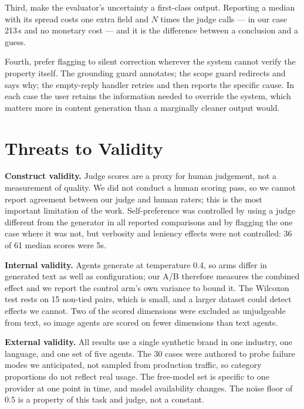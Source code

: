 \documentclass[journal]{IEEEtran}
\begin{document}
Third, make the evaluator's uncertainty a first-class output. Reporting a
median with its spread costs one extra field and $N$ times the judge calls ---
in our case 213\,s and no monetary cost --- and it is the difference between a
conclusion and a guess.

Fourth, prefer flagging to silent correction wherever the system cannot verify
the property itself. The grounding guard annotates; the scope guard redirects
and says why; the empty-reply handler retries and then reports the specific
cause. In each case the user retains the information needed to override the
system, which matters more in content generation than a marginally cleaner
output would.

\section{Threats to Validity}
\label{sec:threats}

\textbf{Construct validity.} Judge scores are a proxy for human judgement, not
a measurement of quality. We did not conduct a human scoring pass, so we cannot
report agreement between our judge and human raters; this is the most important
limitation of the work. Self-preference was controlled by using a judge
different from the generator in all reported comparisons and by flagging the
one case where it was not, but verbosity and leniency effects were not
controlled: 36 of 61 median scores were 5s.

\textbf{Internal validity.} Agents generate at temperature 0.4, so arms differ
in generated text as well as configuration; our A/B therefore measures the
combined effect and we report the control arm's own variance to bound it. The
Wilcoxon test rests on 15 non-tied pairs, which is small, and a larger dataset
could detect effects we cannot. Two of the scored dimensions were excluded as
unjudgeable from text, so image agents are scored on fewer dimensions than
text agents.

\textbf{External validity.} All results use a single synthetic brand in one
industry, one language, and one set of five agents. The 30 cases were authored
to probe failure modes we anticipated, not sampled from production traffic, so
category proportions do not reflect real usage. The free-model set is specific
to one provider at one point in time, and model availability changes. The noise
floor of 0.5 is a property of this task and judge, not a constant.
\end{document}
